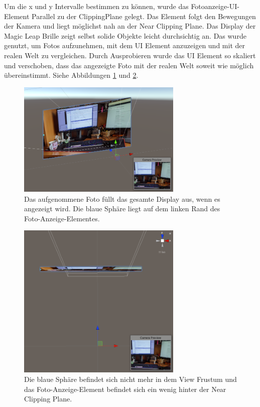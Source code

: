Um die x und y Intervalle bestimmen zu können, wurde das Fotoanzeige-UI-Element Parallel zu der ClippingPlane gelegt. Das Element folgt den Bewegungen der Kamera und liegt möglichst nah an der Near Clipping Plane. Das Display der Magic Leap Brille zeigt selbst solide Objekte leicht durchsichtig an. Das wurde genutzt, um Fotos aufzunehmen, mit dem UI Element anzuzeigen und mit der realen Welt zu vergleichen. Durch Ausprobieren wurde das UI Element so skaliert und verschoben, dass das angezeigte Foto mit der realen Welt soweit wie möglich übereinstimmt. Siehe Abbildungen \ref{illustration:canvasinsourface} und \ref{illustration:canvasinsourfacetodown}.

\begin{figure}[H]
	\centering
	\includegraphics[width=0.7\textwidth]{images/canvasinyourface.PNG}
	\caption[]{Das aufgenommene Foto füllt das gesamte Display aus, wenn es angezeigt wird. Die blaue Sphäre liegt auf dem linken Rand des Foto-Anzeige-Elementes.}
	\label{illustration:canvasinsourface}
\end{figure}

\begin{figure}[H]
	\centering
	\includegraphics[width=0.7\textwidth]{images/canvasinyourfaceTopDown.PNG}
	\caption[]{Die blaue Sphäre befindet sich nicht mehr in dem View Frustum und das Foto-Anzeige-Element befindet sich ein wenig hinter der Near Clipping Plane.}
	\label{illustration:canvasinsourfacetodown}
\end{figure}

